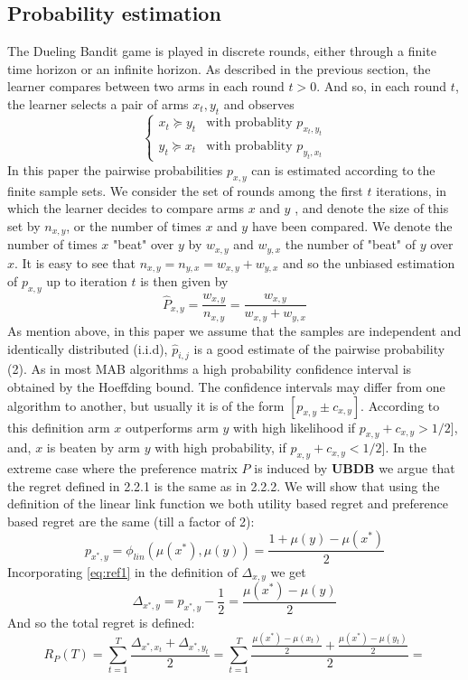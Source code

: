 \documentclass{llncs}
\begin{document}
	\subsection{Probability estimation}		 
		The Dueling Bandit game is played in discrete rounds, either through a finite time horizon or an infinite horizon. 
		 As described in the previous section, the learner compares between two arms in each round $t > 0$. 
		 And so, in each round $t$, the learner selects a pair of arms $x_t,y_t$ and observes
	\begin{equation}
		\begin{cases}
    		x_t \succeq y_t & \text{with probablity } p_{x_t,y_t} 
       	\\
    		y_t \succeq x_t & \text{with probablity } p_{y_t,x_t}
	\end{cases}
	\end{equation}		
	In this paper the pairwise probabilities $p_{x,y}$ can is estimated according to the finite sample sets.
	We consider the set of rounds among the first $t$ iterations, in which the learner decides to compare arms $x$ and $y$ , and denote the size of this set by $n_{x,y}$, or the number of times $x$ and $y$ have been compared.  
	We denote the number of times $x$ "beat" over $y$ by $w_{x,y}$ and $w_{y,x}$ the number of "beat" of $y$ over $x$.
	It is easy to see that $n_{x,y} = n_{y,x} = w_{x,y}+w_{y,x}$ and so the unbiased estimation of $p_{x,y}$ up to iteration $t$ is then given by
	\begin{equation}\label{eq:est_pxy}
		\hat{P}_{x, y} = \frac{w_{x,y}}{n_{x,y}} = 
		\frac{w_{x,y}}{w_{x,y}+w_{y,x}}
	\end{equation}	 
	As mention above, in this paper we assume that the samples are independent and identically distributed (i.i.d), $\hat{p}_{i,j}$ is a good estimate of the pairwise probability (2). 
	As in most MAB algorithms a high probability confidence interval is obtained by the Hoeffding bound. 
	The confidence intervals may differ from one algorithm to another, but usually it is of the form $[p_{x,y} \pm c_{x,y} ]$. 
	According to this definition arm $x$ outperforms arm $y$ with high likelihood if $p_{x,y} + c_{x,y} > 1/2]$, and, $x$ is beaten by arm $y$ with high probability, if $p_{x,y} + c_{x,y} < 1/2]$.
	In the extreme case where the preference matrix $P$ is induced by \textbf{UBDB} we argue that the regret defined in 2.2.1 is the same as in 2.2.2. 
	We will show that using the definition of the linear link function we both utility based regret and preference based regret are the same (till a factor of 2): 
	\begin{equation}\label{eq:ref1}
		p_{x^*,y} = \phi_{lin}(\mu(x^*),\mu(y)) = \frac{1 +\mu(y)-\mu(x^*)}{2}
	\end{equation}
	Incorporating \eqref{eq:ref1} in the definition of $\Delta_{x,y}$ we get
	$$
	\Delta_{x^*,y} = p_{x^*,y} - \frac{1}{2} = \frac{\mu(x^*)-\mu(y)}{2}
	$$
	And so the total regret is defined:
	$$ R_P(T) = \sum_{t=1}^T \frac{\Delta_{x^*,x_t}+\Delta_{x^*,y_t}}{2} =  
\sum_{t=1}^T \frac{\frac{\mu(x^*)-\mu(x_t)}{2}+\frac{\mu(x^*)-\mu(y_t)}{2}}{2} =
$$
\end{document}
